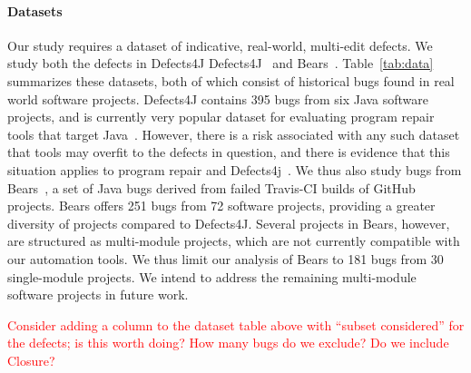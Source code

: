 \documentclass[sigconf, timestamp-false, anonymous=true]{acmart}
\newcommand\todo[1]{\textcolor{red}{#1}}
\begin{document}
\paragraph{Datasets}  Our study requires a dataset of indicative, real-world,
multi-edit defects.  We study both the defects in Defects4J
Defects4J~\cite{defects4j} and Bears~\cite{bears}.  Table~\ref{tab:data}
summarizes these datasets, both of which
consist of historical
bugs found in real world software projects. Defects4J contains 395 bugs from 
six Java software projects, and is currently very popular dataset for evaluating 
program repair tools that target Java~\cite{durieux-repair-them-all}.
However, there is a risk associated with any such dataset that tools may overfit
to the defects in question, and there is evidence that this situation applies to
program repair and Defects4j~\cite{durieux-repair-them-all}. 
We thus also study bugs from Bears~\cite{bears}, 
a set of Java bugs derived from failed Travis-CI builds of GitHub
projects. 
Bears offers 251 bugs from 72 software projects, providing a greater diversity of 
projects compared to Defects4J. 
Several projects in Bears, however, are structured as multi-module projects, 
which are not currently compatible with our automation tools.
We thus limit our analysis of Bears to 181 bugs from 30 single-module projects.
We intend to address the remaining multi-module software projects in future work.

\todo{Consider adding a column to the dataset table above with ``subset
  considered'' for the defects; is this worth doing?  How many bugs do we
  exclude? Do we include Closure?}
\end{document}
